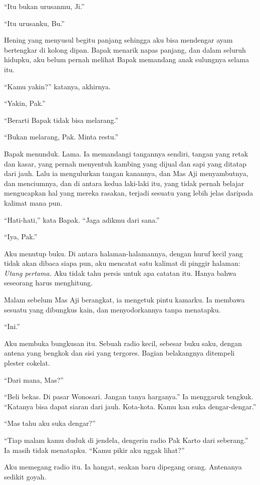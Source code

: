 \documentclass[11pt,twoside,openany]{book}
\makeatletter
\newcommand{\scenebreak}{\par\vspace{0.9em}{\centering\textsc{*\hspace{0.7em}*\hspace{0.7em}*}\par}\vspace{0.9em}\@afterindentfalse\@afterheading}
\makeatother
\begin{document}
``Itu bukan urusanmu, Ji.''

``Itu urusanku, Bu.''

Hening yang menyusul begitu panjang sehingga aku bisa mendengar ayam bertengkar di kolong dipan. Bapak menarik napas panjang, dan dalam seluruh hidupku, aku belum pernah melihat Bapak memandang anak sulungnya selama itu.

``Kamu yakin?'' katanya, akhirnya.

``Yakin, Pak.''

``Berarti Bapak tidak bisa melarang.''

``Bukan melarang, Pak. Minta restu.''

Bapak menunduk. Lama. Ia memandangi tangannya sendiri, tangan yang retak dan kasar, yang pernah menyentuh kambing yang dijual dan sapi yang ditatap dari jauh. Lalu ia mengulurkan tangan kanannya, dan Mas Aji menyambutnya, dan menciumnya, dan di antara kedua laki-laki itu, yang tidak pernah belajar mengucapkan hal yang mereka rasakan, terjadi sesuatu yang lebih jelas daripada kalimat mana pun.

``Hati-hati,'' kata Bapak. ``Jaga adikmu dari sana.''

``Iya, Pak.''

Aku menutup buku. Di antara halaman-halamannya, dengan huruf kecil yang tidak akan dibaca siapa pun, aku mencatat satu kalimat di pinggir halaman: \emph{Utang pertama.} Aku tidak tahu persis untuk apa catatan itu. Hanya bahwa seseorang harus menghitung.

\scenebreak
Malam sebelum Mas Aji berangkat, ia mengetuk pintu kamarku. Ia membawa sesuatu yang dibungkus kain, dan menyodorkannya tanpa menatapku.

``Ini.''

Aku membuka bungkusan itu. Sebuah radio kecil, sebesar buku saku, dengan antena yang bengkok dan sisi yang tergores. Bagian belakangnya ditempeli plester cokelat.

``Dari mana, Mas?''

``Beli bekas. Di pasar Wonosari. Jangan tanya harganya.'' Ia menggaruk tengkuk. ``Katanya bisa dapat siaran dari jauh. Kota-kota. Kamu kan suka dengar-dengar.''

``Mas tahu aku suka dengar?''

``Tiap malam kamu duduk di jendela, dengerin radio Pak Karto dari seberang.'' Ia masih tidak menatapku. ``Kamu pikir aku nggak lihat?''

Aku memegang radio itu. Ia hangat, seakan baru dipegang orang. Antenanya sedikit goyah.
\end{document}
